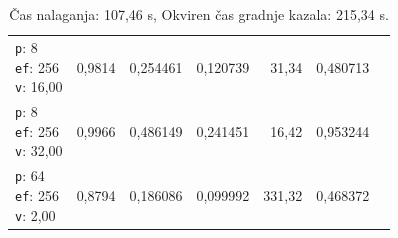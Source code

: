 \begin{table}[htbp]
\begin{tabularx}{\textwidth}{Xrrrrrr}
    \makecell{\texttt{p}: 8\\\texttt{ef}: 256\\\texttt{v}: 16,00} & 0,9814 & 0,254461 & 0,120739 & 31,34 & 0,480713 \\
    \makecell{\texttt{p}: 8\\\texttt{ef}: 256\\\texttt{v}: 32,00} & 0,9966 & 0,486149 & 0,241451 & 16,42 & 0,953244 \\
    \makecell{\texttt{p}: 64\\\texttt{ef}: 256\\\texttt{v}: 2,00} & 0,8794 & 0,186086 & 0,099992 & 331,32 & 0,468372 \\
    \bottomrule
  \end{tabularx}
\caption* {Čas nalaganja: 107,46 s, Okviren čas gradnje kazala: 215,34 s.}\end{table}

\clearpage

